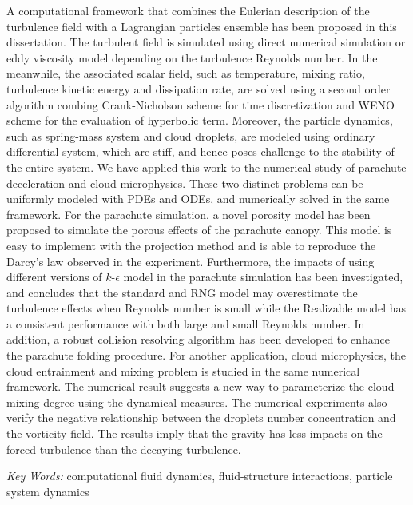 A computational framework that combines the Eulerian description of the turbulence field with a Lagrangian particles ensemble has been proposed in this dissertation. The turbulent field is simulated using direct numerical simulation or eddy viscosity model depending on the turbulence Reynolds number. In the meanwhile, the associated scalar field, such as temperature, mixing ratio, turbulence kinetic energy and dissipation rate, are solved using a second order algorithm combing Crank-Nicholson scheme for time discretization and WENO scheme for the evaluation of hyperbolic term. Moreover, the particle dynamics, such as spring-mass system and cloud droplets, are modeled using ordinary differential system, which are stiff, and hence poses challenge to the stability of the entire system. We have applied this work to the numerical study of parachute deceleration and cloud microphysics. These two distinct problems can be uniformly modeled with PDEs and ODEs, and numerically solved in the same framework. For the parachute simulation, a novel porosity model has been proposed to simulate the porous effects of the parachute canopy. This model is easy to implement with the projection method and is able to reproduce the Darcy's law observed in the experiment. Furthermore, the impacts of using different versions of $k$-$\epsilon$ model in the parachute simulation has been investigated, and concludes that the standard and RNG model may overestimate the turbulence effects when Reynolds number is small while the Realizable model has a consistent performance with both large and small Reynolds number. In addition, a robust collision resolving algorithm has been developed to enhance the parachute folding procedure. For another application, cloud microphysics, the cloud entrainment and mixing problem is studied in the same numerical framework. The numerical result suggests a new way to parameterize the cloud mixing degree using the dynamical measures. The numerical experiments also verify the negative relationship between the droplets number concentration and the vorticity field. The results imply that the gravity has less impacts on the forced turbulence than the decaying turbulence.

{\it Key Words:} computational fluid dynamics, fluid-structure interactions, particle system dynamics

